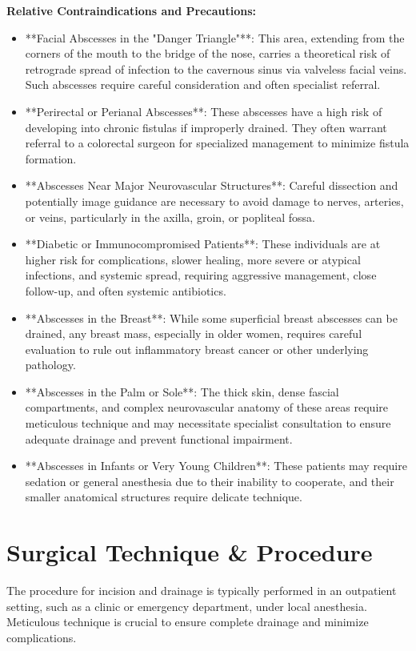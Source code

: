 \textbf{Relative Contraindications and Precautions:}
\begin{itemize}
  \item **Facial Abscesses in the "Danger Triangle"**: This area, extending from the corners of the mouth to the bridge of the nose, carries a theoretical risk of retrograde spread of infection to the cavernous sinus via valveless facial veins. Such abscesses require careful consideration and often specialist referral.

  \item **Perirectal or Perianal Abscesses**: These abscesses have a high risk of developing into chronic fistulas if improperly drained. They often warrant referral to a colorectal surgeon for specialized management to minimize fistula formation.

  \item **Abscesses Near Major Neurovascular Structures**: Careful dissection and potentially image guidance are necessary to avoid damage to nerves, arteries, or veins, particularly in the axilla, groin, or popliteal fossa.

  \item **Diabetic or Immunocompromised Patients**: These individuals are at higher risk for complications, slower healing, more severe or atypical infections, and systemic spread, requiring aggressive management, close follow-up, and often systemic antibiotics.

  \item **Abscesses in the Breast**: While some superficial breast abscesses can be drained, any breast mass, especially in older women, requires careful evaluation to rule out inflammatory breast cancer or other underlying pathology.

  \item **Abscesses in the Palm or Sole**: The thick skin, dense fascial compartments, and complex neurovascular anatomy of these areas require meticulous technique and may necessitate specialist consultation to ensure adequate drainage and prevent functional impairment.

  \item **Abscesses in Infants or Very Young Children**: These patients may require sedation or general anesthesia due to their inability to cooperate, and their smaller anatomical structures require delicate technique.
\end{itemize}

\section*{Surgical Technique \& Procedure}
The procedure for incision and drainage is typically performed in an outpatient setting, such as a clinic or emergency department, under local anesthesia. Meticulous technique is crucial to ensure complete drainage and minimize complications.

